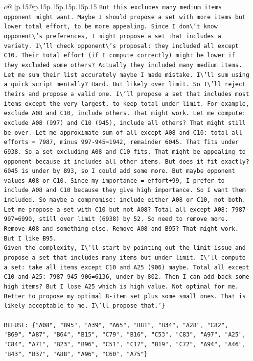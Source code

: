 \documentclass{article}
\begin{document}
{\begin{supertabular}{c@{$\;$}|p{.15\linewidth}@{}p{.15\linewidth}p{.15\linewidth}p{.15\linewidth}p{.15\linewidth}p{.15\linewidth}}
{{{\texttt{But this excludes many medium items opponent might want. Maybe I should propose a set with more items but lower total effort, to be more appealing. Since I don\textbackslash{}'t know opponent\textbackslash{}'s preferences, I might propose a set that includes a variety. I\textbackslash{}'ll check opponent\textbackslash{}'s proposal: they included all except C10. Their total effort (if I compute correctly) might be lower if they excluded some others? Actually they included many medium items. Let me sum their list accurately maybe I made mistake. I\textbackslash{}'ll sum using a quick script mentally? Hard. But likely over limit. So I\textbackslash{}'ll reject theirs and propose a valid one. I\textbackslash{}'ll propose a set that includes most items except the very largest, to keep total under limit. For example, exclude A08 and C10, include others. That might work. Let me compute: exclude A08 (997) and C10 (945), include all others? That might still be over. Let me approximate sum of all except A08 and C10: total all efforts = 7987, minus 997{-}945=1942, remainder 6045. That fits under 6938. So a set excluding A08 and C10 fits. That might be appealing to opponent because it includes all other items. But does it fit exactly? 6045 is under by 893, so I could add some more. But maybe opponent values A08 or C10. Since my importance = effort+99, I prefer to include A08 and C10 because they give high importance. So I want them included. So maybe a compromise: include either A08 or C10, not both. } \\
\texttt{Let me propose a set with C10 but not A08? Total all except A08: 7987{-}997=6990, still over limit (6938) by 52. So need to remove more. Remove A08 and something else. Remove A08 and B95? That might work. But I like B95. } \\
\texttt{Given the complexity, I\textbackslash{}'ll start by pointing out the limit issue and propose a set that includes many items but under limit. I\textbackslash{}'ll compute a set: take all items except C10 and A25 (906) maybe. Total all except C10 and A25: 7987{-}945{-}906=6136, under by 802. Then I can add back some high items? But I lose A25 which is high value. Not optimal for me. } \\
\texttt{Better to propose my optimal 8{-}item set plus some small ones. That is likely acceptable to me. I\textbackslash{}'ll propose that.'\}} \\
\\ 
\texttt{REFUSE: \{"A08", "B95", "A39", "A65", "B81", "B34", "A28", "C82", "B69", "A87", "B64", "B15", "C79", "B16", "C53", "C83", "A97", "A25", "C84", "A71", "B23", "B96", "C51", "C17", "B19", "C72", "A94", "A46", "B43", "B37", "A88", "A96", "C60", "A75"\}} \\
}}}
\end{supertabular}}
\end{document}
